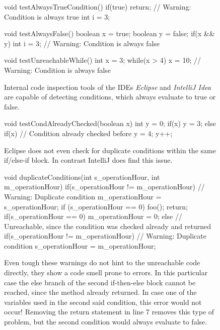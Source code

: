 
\begin{figure}[h!]
	\begin{JavaCode}
void testAlwaysTrueCondition() {
	if(true) return; // Warning: Condition is always true
	int i = 3;
}

void testAlwaysFalse() {
	boolean x = true;
	boolean y = false;
	if(x && y) int i = 3; // Warning: Condition is always false
}

void testUnreachableWhile() {
	int x = 3;
	while(x > 4) x = 10; // Warning: Condition is always false
}\end{JavaCode}
	\caption{Internal code inspection tools of the IDEs \emph{Eclipse} and \emph{IntelliJ Idea} are capable of detecting conditions, which always evaluate to true or false.}
	\label{code:java eclipse intelij always true or false}
\end{figure}

\begin{figure}
	\begin{JavaCode}
void testCondAlreadyChecked(boolean x) {
	int y = 0;
	if(x) {
		y = 3;
	} else if(x) { // Condition already checked before
		y = 4;
	}
	y++;
}\end{JavaCode}
\caption{Eclipse does not even check for duplicate conditions within the same if/else-if block. In contrast IntelliJ does find this issue.}
\label{code:java eclipse fail to find this}
\end{figure}

\begin{figure}
	\begin{JavaCode}
void duplicateConditions(int s_operationHour, int m_operationHour) {
	if(s_operationHour != m_operationHour) { // Warning: Duplicate condition
		m_operationHour = s_operationHour;
		if (s_operationHour == 0) {
			foo();        
		}
		return;
	}
	if(s_operationHour == 0) {
		m_operationHour = 0;
	} else {
		// Unreachable, since the condition was checked already and returned
		if(s_operationHour != m_operationHour) { // Warning: Duplicate condition
			s_operationHour = m_operationHour;
		}
	}
}\end{JavaCode}
	\caption{Even tough these warnings do not hint to the unreachable code directly, they show a code smell prone to errors. In this particular case the else branch of the second if-then-else block cannot be reached, since the method already returned. In case one of the variables used in the second said condition, this error would not occur! Removing the return statement in line 7 removes this type of problem, but the second condition would always evaluate to false. }
	\label{code:java intelij duplicate conditions}
\end{figure}

